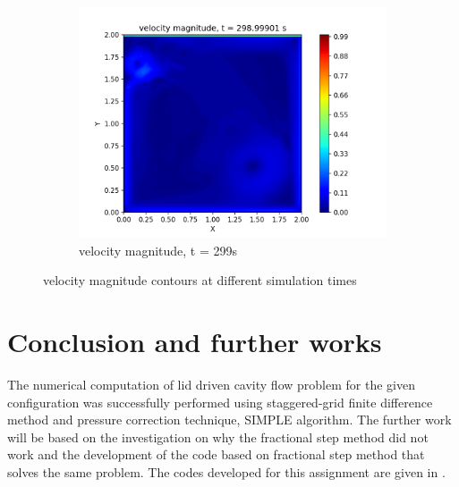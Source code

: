 \begin{figure}
\begin{subfigure}{0.5\textwidth}
    \end{subfigure}
    \hfill
    \begin{subfigure}{1\textwidth}
       \centering
        \includegraphics[scale=0.5]{supporting_documents/contours/velocity-magnitude/velocityMagnitude_0000000299.png}
        \caption{velocity magnitude, t = 299s}
    \end{subfigure}

    \caption{velocity magnitude contours at different simulation times}
    \label{velocityMagnitude_contour}

\end{figure}

\pagebreak

\section{Conclusion and further works}
\par The numerical computation of lid driven cavity flow problem for the given
configuration was successfully performed using staggered-grid finite difference
method and pressure correction technique, SIMPLE algorithm. The further work
will be based on the investigation on why the fractional step method did not
work and the development of the code based on fractional step method that
solves the same problem. The codes developed for this assignment are given in
.
